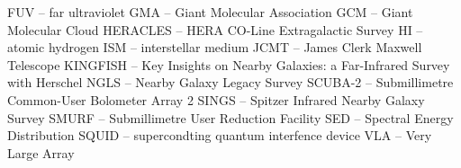 FUV -- far ultraviolet
GMA -- Giant Molecular Association
GCM -- Giant Molecular Cloud
HERACLES -- HERA CO-Line Extragalactic Survey
HI -- atomic hydrogen
ISM -- interstellar medium
JCMT -- James Clerk Maxwell Telescope
KINGFISH -- Key Insights on Nearby Galaxies: a Far-Infrared Survey with Herschel
NGLS -- Nearby Galaxy Legacy Survey
SCUBA-2 -- Submillimetre Common-User Bolometer Array 2
SINGS -- Spitzer Infrared Nearby Galaxy Survey
SMURF -- Submillimetre User Reduction Facility
SED -- Spectral Energy Distribution
SQUID -- supercondting quantum interfence device
VLA -- Very Large Array
